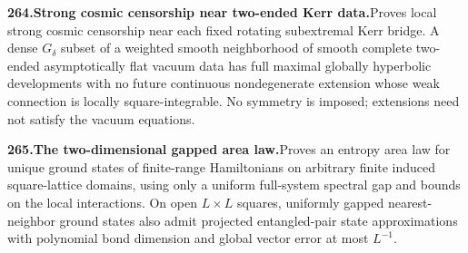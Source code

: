 \documentclass[11pt,a4paper]{article}
\begin{document}
  \par \begin{minipage}{\linewidth}
  \fontsize{10.5}{12.6}\selectfont\RaggedRight
  \hypertarget{result 264}{}
  {\bfseries\textcolor{muted}{264.}\enspace Strong cosmic censorship near two-ended Kerr data.}\enspace Proves local strong cosmic censorship near each fixed rotating subextremal Kerr bridge. A dense $G_\delta$ subset of a weighted smooth neighborhood of smooth complete two-ended asymptotically flat vacuum data has full maximal globally hyperbolic developments with no future continuous nondegenerate extension whose weak connection is locally square-integrable. No symmetry is imposed; extensions need not satisfy the vacuum equations.\par
  \end{minipage}\par\vspace{5pt}



  \par \begin{minipage}{\linewidth}
  \fontsize{10.5}{12.6}\selectfont\RaggedRight
  \hypertarget{result 265}{}
  {\bfseries\textcolor{muted}{265.}\enspace The two-dimensional gapped area law.}\enspace Proves an entropy area law for unique ground states of finite-range Hamiltonians on arbitrary finite induced square-lattice domains, using only a uniform full-system spectral gap and bounds on the local interactions. On open $L\times L$ squares, uniformly gapped nearest-neighbor ground states also admit projected entangled-pair state approximations with polynomial bond dimension and global vector error at most $L^{-1}$.\par
  \end{minipage}\par\vspace{5pt}
\end{document}
